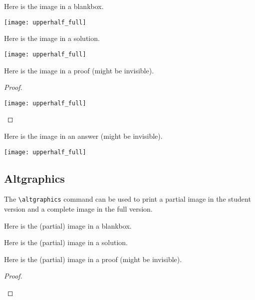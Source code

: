 \documentclass{article}
\theoremstyle{break}
\begin{document}
Here is the image in a blankbox.
\begin{blankbox}
\begin{center}
\texttt{[image: upperhalf\_full]}
\end{center}
\end{blankbox}

Here is the image in a solution.
\begin{solution}
\begin{center}
\texttt{[image: upperhalf\_full]}
\end{center}
\end{solution}

Here is the image in a proof (might be invisible).
\begin{proof}
\begin{center}
\texttt{[image: upperhalf\_full]}
\end{center}
\end{proof}

Here is the image in an answer (might be invisible).
\begin{answer}
\begin{center}
\texttt{[image: upperhalf\_full]}
\end{center}
\end{answer}

\subsection{Altgraphics}

The \verb+\altgraphics+ command can be used to print a partial image in the student version and a complete image in the full version. 

Here is the (partial) image in a blankbox.
\begin{blankbox}
\begin{center}
\end{center}
\end{blankbox}

Here is the (partial) image in a solution.
\begin{solution}
\begin{center}
\end{center}
\end{solution}

Here is the (partial) image in a proof (might be invisible).
\begin{proof}
\begin{center}
\end{center}
\end{proof}
\end{document}
